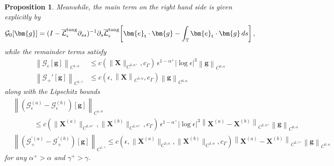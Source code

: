 \documentclass[11pt,reqno]{amsart}
\newcommand{\T}{\mathbb{T}}
\newcommand{\X}{\bm{X}}
\newcommand{\be}{\bm{e}}
\newcommand{\p}{\partial}
\newcommand{\abs}[1]{\left\lvert #1 \right\rvert}
\newcommand{\norm}[1]{\left\lVert #1 \right\rVert}
\newcommand{\mc}[1]{\mathcal{#1}}
\newtheorem{proposition}[theorem]{Proposition}
\theoremstyle{definition}
\begin{document}
\begin{proposition}
Meanwhile, the main term on the right hand side is given explicitly by
\begin{equation}
  \mc{G}_0[\bm{g}] = (I-\overline{\mc{L}}_\epsilon^{\rm tang}\p_{ss})^{-1}\p_s\overline{\mc{L}}_\epsilon^{\rm tang}\bigg[\be_{\rm t}\cdot\bm{g}-\int_\T\be_{\rm t}\cdot\bm{g}\,ds \bigg]\,,
\end{equation}
while the remainder terms satisfy 
\begin{equation}
\begin{aligned}
  \norm{\mc{G}_\epsilon[\bm{g}]}_{C^{1,\alpha}}&\le c(\|\X\|_{C^{2,\alpha^+}},c_\Gamma)\,\epsilon^{1-\alpha^+}\abs{\log\epsilon}^3\norm{\bm{g}}_{C^{0,\alpha}}\\
  \norm{\mc{G}_+'[\bm{g}]}_{C^{1,\gamma}}&\le c(\epsilon,\norm{\X}_{C^{3,\alpha}},c_\Gamma)\norm{\bm{g}}_{C^{0,\alpha}}
\end{aligned}
\end{equation}
along with the Lipschitz bounds
\begin{equation}
\begin{aligned}
  &\norm{(\mc{G}_\epsilon^{(a)}-\mc{G}_\epsilon^{(b)})[\bm{g}]}_{C^{1,\alpha}}\\
  &\quad\qquad\le c(\|\X^{(a)}\|_{C^{2,\alpha^+}},\|\X^{(b)}\|_{C^{2,\alpha^+}},c_\Gamma)\,\epsilon^{1-\alpha^+}\abs{\log\epsilon}^3\norm{\X^{(a)}-\X^{(b)}}_{C^{2,\alpha^+}}\norm{\bm{g}}_{C^{0,\alpha}}\\
  &\norm{(\mc{G}_+^{'(a)}-\mc{G}_+^{'(b)})[\bm{g}]}_{C^{1,\gamma}}\le c(\epsilon,\|\X^{(a)}\|_{C^{3,\alpha}},\|\X^{(b)}\|_{C^{3,\alpha}},c_\Gamma)\norm{\X^{(a)}-\X^{(b)}}_{C^{2,\gamma^+}}\norm{\bm{g}}_{C^{0,\alpha}}
\end{aligned}
\end{equation}
for any $\alpha^+>\alpha$ and $\gamma^+>\gamma$.
\end{proposition}
\end{document}
